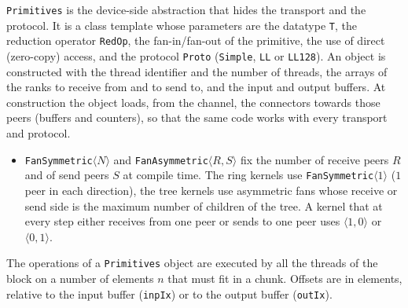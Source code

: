 \texttt{Primitives} is the device-side abstraction that hides the transport and the protocol.
It is a class template whose parameters are the datatype \texttt{T}, the reduction operator \texttt{RedOp}, the fan-in/fan-out of the primitive, the use of direct (zero-copy) access, and the protocol \texttt{Proto} (\texttt{Simple}, \texttt{LL} or \texttt{LL128}).
An object is constructed with the thread identifier and the number of threads, the arrays of the ranks to receive from and to send to, and the input and output buffers.
At construction the object loads, from the channel, the connectors towards those peers (buffers and counters), so that the same code works with every transport and protocol.
\begin{itemize}
  \item \texttt{FanSymmetric}$\langle N\rangle$ and \texttt{FanAsymmetric}$\langle R,S\rangle$ fix the number of receive peers $R$ and of send peers $S$ at compile time. The ring kernels use \texttt{FanSymmetric}$\langle1\rangle$ ($1$ peer in each direction), the tree kernels use asymmetric fans whose receive or send side is the maximum number of children of the tree. A kernel that at every step either receives from one peer or sends to one peer uses $\langle 1,0\rangle$ or $\langle 0,1\rangle$.
\end{itemize}
The operations of a \texttt{Primitives} object are executed by all the threads of the block on a number of elements $n$ that must fit in a chunk.
Offsets are in elements, relative to the input buffer (\texttt{inpIx}) or to the output buffer (\texttt{outIx}).
